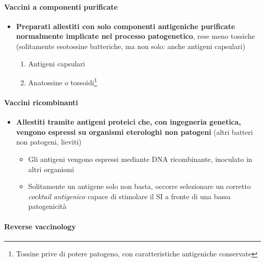 \documentclass[italian,]{article}
\providecommand{\tightlist}{%
  \setlength{\itemsep}{0pt}\setlength{\parskip}{0pt}}
\begin{document}
\hypertarget{vaccini-a-componenti-purificate}{%
\paragraph{Vaccini a componenti
purificate}\label{vaccini-a-componenti-purificate}}

\begin{itemize}
\tightlist
\item
  \textbf{Preparati allestiti con solo componenti antigeniche purificate
  normalmente implicate nel processo patogenetico}, rese meno tossiche
  (solitamente esotossine batteriche, ma non solo: anche antigeni
  capsulari)

  \begin{enumerate}
  \def\labelenumi{\arabic{enumi}.}
  \tightlist
  \item
    Antigeni capsulari
  \item
    Anatossine o tossoidi\footnote{Tossine prive di potere patogeno, con
      caratteristiche antigeniche conservate}
  \end{enumerate}
\end{itemize}

\hypertarget{vaccini-ricombinanti}{%
\paragraph{Vaccini ricombinanti}\label{vaccini-ricombinanti}}

\begin{itemize}
\tightlist
\item
  \textbf{Allestiti tramite antigeni proteici che, con ingegneria
  genetica, vengono espressi su organismi eterologhi non patogeni}
  (altri batteri non patogeni, lieviti)

  \begin{itemize}
  \tightlist
  \item
    Gli antigeni vengono espressi mediante DNA ricombinante, inoculato
    in altri organismi
  \item
    Solitamente un antigene solo non basta, occorre selezionare un
    corretto \emph{cocktail antigenico} capace di stimolare il SI a
    fronte di una bassa patogenicità
  \end{itemize}
\end{itemize}

\hypertarget{reverse-vaccinology}{%
\paragraph{Reverse vaccinology}\label{reverse-vaccinology}}
\end{document}
